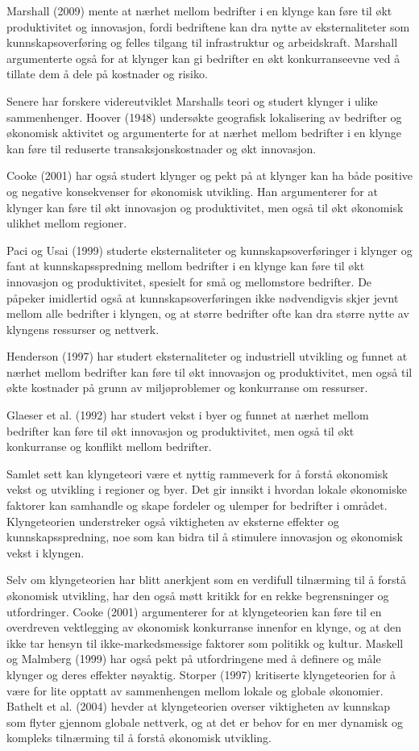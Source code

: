 \documentclass[
]{article}
\begin{document}
Marshall (2009) mente at nærhet mellom bedrifter i en klynge kan føre
til økt produktivitet og innovasjon, fordi bedriftene kan dra nytte av
eksternaliteter som kunnskapsoverføring og felles tilgang til
infrastruktur og arbeidskraft. Marshall argumenterte også for at klynger
kan gi bedrifter en økt konkurranseevne ved å tillate dem å dele på
kostnader og risiko.

Senere har forskere videreutviklet Marshalls teori og studert klynger i
ulike sammenhenger. Hoover (1948) undersøkte geografisk lokalisering av
bedrifter og økonomisk aktivitet og argumenterte for at nærhet mellom
bedrifter i en klynge kan føre til reduserte transaksjonskostnader og
økt innovasjon.

Cooke (2001) har også studert klynger og pekt på at klynger kan ha både
positive og negative konsekvenser for økonomisk utvikling. Han
argumenterer for at klynger kan føre til økt innovasjon og
produktivitet, men også til økt økonomisk ulikhet mellom regioner.

Paci og Usai (1999) studerte eksternaliteter og kunnskapsoverføringer i
klynger og fant at kunnskapsspredning mellom bedrifter i en klynge kan
føre til økt innovasjon og produktivitet, spesielt for små og
mellomstore bedrifter. De påpeker imidlertid også at
kunnskapsoverføringen ikke nødvendigvis skjer jevnt mellom alle
bedrifter i klyngen, og at større bedrifter ofte kan dra større nytte av
klyngens ressurser og nettverk.

Henderson (1997) har studert eksternaliteter og industriell utvikling og
funnet at nærhet mellom bedrifter kan føre til økt innovasjon og
produktivitet, men også til økte kostnader på grunn av miljøproblemer og
konkurranse om ressurser.

Glaeser et al. (1992) har studert vekst i byer og funnet at nærhet
mellom bedrifter kan føre til økt innovasjon og produktivitet, men også
til økt konkurranse og konflikt mellom bedrifter.

Samlet sett kan klyngeteori være et nyttig rammeverk for å forstå
økonomisk vekst og utvikling i regioner og byer. Det gir innsikt i
hvordan lokale økonomiske faktorer kan samhandle og skape fordeler og
ulemper for bedrifter i området. Klyngeteorien understreker også
viktigheten av eksterne effekter og kunnskapsspredning, noe som kan
bidra til å stimulere innovasjon og økonomisk vekst i klyngen.

Selv om klyngeteorien har blitt anerkjent som en verdifull tilnærming
til å forstå økonomisk utvikling, har den også møtt kritikk for en rekke
begrensninger og utfordringer. Cooke (2001) argumenterer for at
klyngeteorien kan føre til en overdreven vektlegging av økonomisk
konkurranse innenfor en klynge, og at den ikke tar hensyn til
ikke-markedsmessige faktorer som politikk og kultur. Maskell og Malmberg
(1999) har også pekt på utfordringene med å definere og måle klynger og
deres effekter nøyaktig. Storper (1997) kritiserte klyngeteorien for å
være for lite opptatt av sammenhengen mellom lokale og globale
økonomier. Bathelt et al. (2004) hevder at klyngeteorien overser
viktigheten av kunnskap som flyter gjennom globale nettverk, og at det
er behov for en mer dynamisk og kompleks tilnærming til å forstå
økonomisk utvikling.
\end{document}
